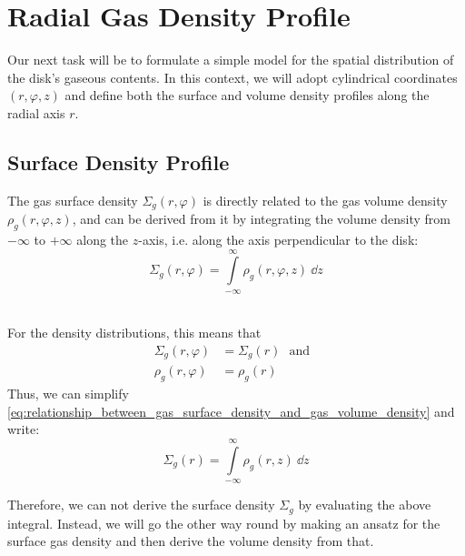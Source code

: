\newpage\section{Radial Gas Density Profile}

    Our next task will be to formulate a simple model for the spatial distribution of the disk's 
    gaseous contents. In this context, we will adopt cylindrical coordinates $(r, \varphi, z)$ and
    define both the surface and volume density profiles along the radial axis $r$.

    \subsection{Surface Density Profile}

        The gas surface density $\Sigma_g(r,\varphi)$ is directly related to the gas volume density
        $\rho_g(r,\varphi,z)$, and can be derived from it by integrating the volume density from 
        $-\infty$ to $+\infty$ along the $z$-axis, i.e. along the axis perpendicular to the disk:
        \begin{equation}
            \label{eq:relationship_between_gas_surface_density_and_gas_volume_density}
            \Sigma_g(r,\varphi)
                = \int\limits_{-\infty}^{\infty} \rho_g(r,\varphi,z)\ \dd z
        \end{equation}

         \\
        For the density distributions, this means that
        \begin{align}
            \Sigma_g(r, \varphi) 
                &= \Sigma_g(r) 
            \ \ \ \text{and}\ \ \
            \\
            \rho_g(r, \varphi) 
                &= \rho_g(r)
        \end{align}
        Thus, we can simplify 
        \cref{eq:relationship_between_gas_surface_density_and_gas_volume_density} and write:
        \begin{equation}
            \Sigma_g(r)
                = \int\limits_{-\infty}^{\infty} \rho_g(r,z)\ \dd z
        \end{equation}
        
        Therefore, we can not derive the surface density $\Sigma_g$ by evaluating the above
        integral. Instead, we will go the other way round by making an ansatz for the surface gas
        density and then derive the volume density from that. \\

